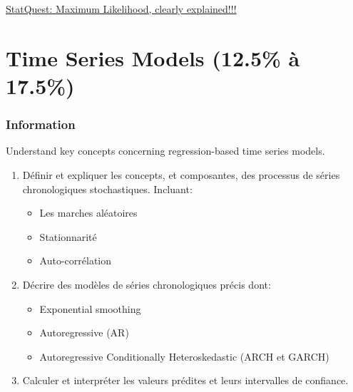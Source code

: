 \documentclass[12pt, titlepage, french]{report}
\begin{document}
\begin{YTB_SUMM}{\href{https://www.youtube.com/watch?v=XepXtl9YKwc&feature=youtu.be}{StatQuest: Maximum Likelihood, clearly explained!!!}}
\end{YTB_SUMM}

\newpage

\chapter[Time Series Models]{Time Series Models (12.5\% à 17.5\%)}

\subsection{Information}

\begin{distributions}[Objective]
Understand key concepts concerning regression-based time series models.
\end{distributions}

\begin{outcomes}
\begin{enumerate}
	\item	Définir et expliquer les concepts, et composantes, des processus de séries chronologiques stochastiques. Incluant:
	\begin{itemize}
		\item	Les marches aléatoires
		\item	Stationnarité
		\item	Auto-corrélation
	\end{itemize}
	\item	Décrire des modèles de séries chronologiques précis dont:
	\begin{itemize}
		\item	Exponential smoothing
		\item	Autoregressive (AR)
		\item	Autoregressive Conditionally Heteroskedastic (ARCH et GARCH)
	\end{itemize}
	\item	Calculer et interpréter les valeurs prédites et leurs intervalles de confiance.
\end{enumerate}
\end{outcomes}
\end{document}
